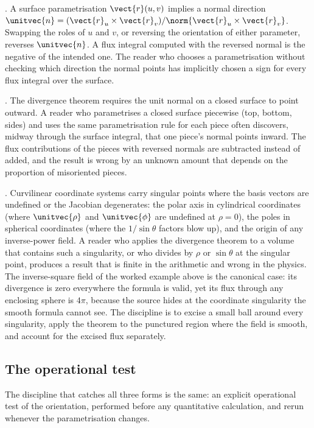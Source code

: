 . A surface parametrisation
$\vect{r}(u, v)$ implies a normal direction $\unitvec{n} =
(\vect{r}_{u} \times \vect{r}_{v}) / \norm{\vect{r}_{u} \times
\vect{r}_{v}}$. Swapping the roles of $u$ and $v$, or reversing the
orientation of either parameter, reverses $\unitvec{n}$. A flux
integral computed with the reversed normal is the negative of the
intended one. The reader who chooses a parametrisation without
checking which direction the normal points has implicitly chosen a
sign for every flux integral over the surface.

. The divergence
theorem requires the unit normal on a closed surface to point
outward. A reader who parametrises a closed surface piecewise
(top, bottom, sides) and uses the same parametrisation rule for
each piece often discovers, midway through the surface integral,
that one piece's normal points inward. The flux contributions of
the pieces with reversed normals are subtracted instead of added,
and the result is wrong by an unknown amount that depends on the
proportion of misoriented pieces.

. Curvilinear coordinate
systems carry singular points where the basis vectors are undefined or
the Jacobian degenerates: the polar axis in cylindrical coordinates
(where $\unitvec{\rho}$ and $\unitvec{\phi}$ are undefined at
$\rho = 0$), the poles in spherical coordinates (where the
$1/\sin\theta$ factors blow up), and the origin of any inverse-power
field. A reader who applies the divergence theorem to a volume that
contains such a singularity, or who divides by $\rho$ or $\sin\theta$
at the singular point, produces a result that is finite in the
arithmetic and wrong in the physics. The inverse-square field of the
worked example above is the canonical case: its divergence is zero
everywhere the formula is valid, yet its flux through any enclosing
sphere is $4\pi$, because the source hides at the coordinate
singularity the smooth formula cannot see. The discipline is to
excise a small ball around every singularity, apply the theorem to the
punctured region where the field is smooth, and account for the
excised flux separately.

\subsection{The operational test}

The discipline that catches all three forms is the same: an explicit
operational test of the orientation, performed before any
quantitative calculation, and rerun whenever the parametrisation
changes.

